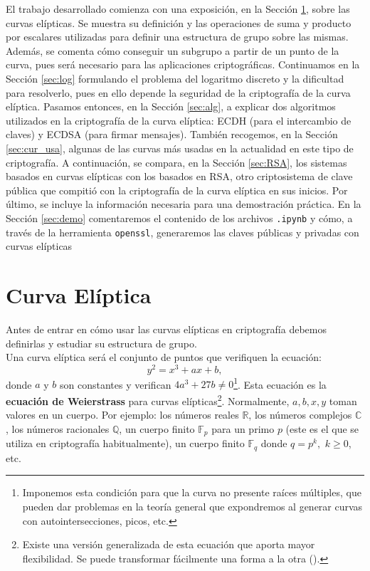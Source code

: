 \documentclass[11pt]{article}
\begin{document}
El trabajo desarrollado comienza con una exposición, en la Sección \ref{sec:curva}, sobre las curvas elípticas. Se muestra su definición y las operaciones de suma y producto por escalares utilizadas para definir una estructura de grupo sobre las mismas. Además, se comenta cómo conseguir un subgrupo a partir de un punto de la curva, pues será necesario para las aplicaciones criptográficas. Continuamos en la Sección \ref{sec:log} formulando el problema del logaritmo discreto y la dificultad para resolverlo, pues en ello depende la seguridad de la criptografía de la curva elíptica. Pasamos entonces, en la Sección \ref{sec:alg}, a explicar dos algoritmos utilizados en la criptografía de la curva elíptica: ECDH (para el intercambio de claves) y ECDSA (para firmar mensajes). También recogemos, en la Sección \ref{sec:cur_usa}, algunas de las curvas más usadas en la actualidad en este tipo de criptografía.
A continuación, se compara, en la Sección \ref{sec:RSA}, los sistemas basados en curvas elípticas con los basados en RSA, otro criptosistema de clave pública que compitió con la criptografía de la curva elíptica en sus inicios. Por último, se incluye la información necesaria para una demostración práctica. En la Sección \ref{sec:demo} comentaremos el contenido de los archivos \texttt{.ipynb} y cómo, a través de la herramienta \texttt{openssl}, generaremos las claves públicas y privadas con curvas elípticas\\

\section{Curva Elíptica}
\label{sec:curva}
Antes de entrar en cómo usar las curvas elípticas en criptografía debemos definirlas y estudiar su estructura de grupo.\\

Una curva elíptica será el conjunto de puntos que verifiquen la ecuación:
\[y^2 = x^3 + ax + b,\]
donde $a$ y $b$ son constantes y verifican $4a^3+27b \neq 0$\footnote{Imponemos esta condición para que la curva no presente raíces múltiples, que pueden dar problemas en la teoría general que expondremos al generar curvas con autointersecciones, picos, etc. }. Esta ecuación es la \textbf{ecuación de Weierstrass} para curvas elípticas\footnote{Existe una versión generalizada de esta ecuación que aporta mayor flexibilidad. Se puede transformar fácilmente una forma a la otra (\cite{washington_elliptic_2008}).}. Normalmente, $a, b, x, y$ toman valores en un cuerpo. Por ejemplo: los números reales $\mathbb{R}$, los números complejos $\mathbb{C}$, los números racionales $\mathbb{Q}$, un cuerpo finito $\mathbb{F}_p$ para un primo $p$ (este es el que se utiliza en criptografía habitualmente), un cuerpo finito $\mathbb{F}_q$ donde $q = p^k,$ $k \ge 0$, etc.\\
\end{document}
